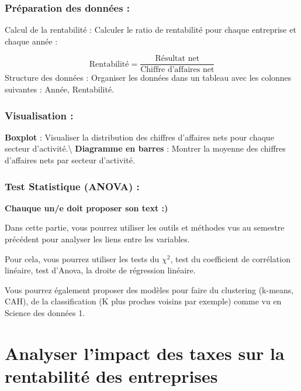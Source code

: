 \documentclass[mstat,12pt]{unswthesis}
\begin{document}
\subsubsection{Préparation des données
:}\label{pruxe9paration-des-donnuxe9es-1}

Calcul de la rentabilité : Calculer le ratio de rentabilité pour chaque
entreprise et chaque année :

\[
\text{Rentabilité} = \frac{\text{Résultat net}}{\text{Chiffre d'affaires net}}
\] Structure des données : Organiser les données dans un tableau avec
les colonnes suivantes : Année, Rentabilité.

\subsubsection{Visualisation :}\label{visualisation-1}

\textbf{Boxplot} : Visualiser la distribution des chiffres d'affaires
nets pour chaque secteur d'activité.\textbackslash{} \textbf{Diagramme
en barres} : Montrer la moyenne des chiffres d'affaires nets par secteur
d'activité.

\subsubsection{Test Statistique (ANOVA)
:}\label{test-statistique-anova-1}

\textbf{Chauque un/e doit proposer son text :) }

Dans cette partie, vous pourrez utiliser les outils et méthodes vus au
semestre précédent pour analyser les liens entre les variables.

Pour cela, vous pourrez utiliser les tests du \(\chi^2\), test du
coefficient de corrélation linéaire, test d'Anova, la droite de
régression linéaire.

Vous pourrez également proposer des modèles pour faire du clustering
(k-means, CAH), de la classification (K plus proches voisins par
exemple) comme vu en Science des données 1.

\section{\texorpdfstring{\textbf{Analyser l'impact des taxes sur la
rentabilité des
entreprises}}{Analyser l'impact des taxes sur la rentabilité des entreprises}}\label{analyser-limpact-des-taxes-sur-la-rentabilituxe9-des-entreprises}

\bigskip
\end{document}
